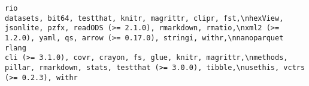 \documentclass[
  letterpaper,
  DIV=11,
  numbers=noendperiod]{scrreprt}
\begin{document}
\begin{verbatim}
rio                                                                                                                                                                                                                                                                                                                                                                                                                                                                                                                                                                                                                                                                                                                                                                                                                                                                                                                                                                                                                                                                                                      datasets, bit64, testthat, knitr, magrittr, clipr, fst,\nhexView, jsonlite, pzfx, readODS (>= 2.1.0), rmarkdown, rmatio,\nxml2 (>= 1.2.0), yaml, qs, arrow (>= 0.17.0), stringi, withr,\nnanoparquet
rlang                                                                                                                                                                                                                                                                                                                                                                                                                                                                                                                                                                                                                                                                                                                                                                                                                                                                                                                                                                                                                                                                                                                                             cli (>= 3.1.0), covr, crayon, fs, glue, knitr, magrittr,\nmethods, pillar, rmarkdown, stats, testthat (>= 3.0.0), tibble,\nusethis, vctrs (>= 0.2.3), withr

\end{verbatim}
\end{document}
